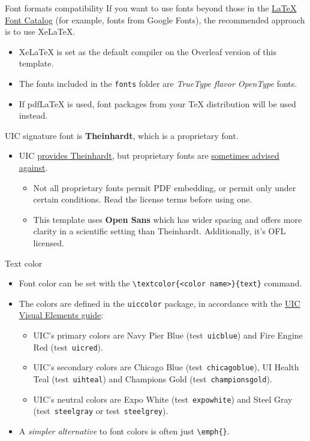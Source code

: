 \documentclass{beamer}
\newcommand{\hrefcol}[2]{\textcolor{uihteal}{\href{#1}{#2}}}
\newcommand{\testcolor}[1]{\colorbox{#1}{\textcolor{#1}{test}}~\texttt{#1}}
\begin{document}
\begin{frame}[fragile]{Font formats compatibility}
If you want to use fonts beyond those in the \hrefcol{https://tug.org/FontCatalogue/}{LaTeX Font Catalog} (for example, fonts from Google Fonts), the recommended approach is to use XeLaTeX.
\begin{itemize}
\item XeLaTeX is set as the default compiler on the Overleaf version of this template.
\item The fonts included in the \verb|fonts| folder are \emph{TrueType flavor OpenType} fonts.
\item If pdfLaTeX is used, font packages from your TeX distribution will be used instead.
\end{itemize}
UIC signature font is \textbf{Theinhardt}, which is a proprietary font.
\begin{itemize}
\item UIC \hrefcol{https://marketing.uic.edu/marketing-toolbox/uic-fonts/}{provides Theinhardt}, but proprietary fonts are \hrefcol{https://studentservices.stanford.edu/my-academics/earn-my-degree/graduate-degree-progress/dissertations-and-theses/prepare-your-work-0\#fontsize}{sometimes advised against}.
\begin{itemize}
    \item Not all proprietary fonts permit PDF embedding, or permit only under certain conditions. Read the license terms before using one.
    \item This template uses \textbf{Open Sans} which has wider spacing and offers more clarity in a scientific setting than Theinhardt. Additionally, it's OFL licensed.
\end{itemize}
\end{itemize}
\end{frame}


\begin{frame}[fragile]{Text color}
\begin{itemize}
\item Font color can be set with the \verb|\textcolor{<color name>}{text}| command.
\item The colors are defined in the \texttt{uiccolor} package, in accordance with the \hrefcol{https://marketing.uic.edu/marketing-toolbox/university-style-guide/visual-elements/}{UIC Visual Elements guide}:
  \begin{itemize}
  \item UIC's primary colors are Navy Pier Blue (\testcolor{uicblue}) and Fire Engine Red (\testcolor{uicred}).
  \item UIC's secondary colors are Chicago Blue (\testcolor{chicagoblue}), UI Health Teal (\testcolor{uihteal}) and Champions Gold (\testcolor{championsgold}).
  \item UIC's neutral colors are Expo White (\testcolor{expowhite}) and Steel Gray (\testcolor{steelgray} or \testcolor{steelgrey}).
  \end{itemize}
\item A \emph{simpler alternative} to font colors is often just \verb|\emph{}|.
\end{itemize}
\end{frame}
\end{document}

